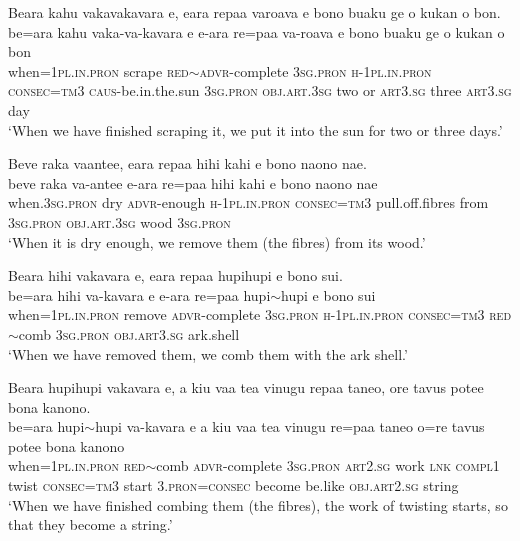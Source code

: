 \ea\label{ex:text20-6}
Beara kahu vakavakavara e, eara repaa varoava e bono buaku ge o kukan o bon.\\
\gll be=ara	kahu	vaka-va-kavara	e	e-ara	re=paa	va-roava	e	bono	buaku	ge	o	kukan	o	bon\\
     when=1\textsc{pl}.\textsc{in}.\textsc{pron}	scrape	\textsc{red}{$\sim$}\textsc{advr}-complete	3\textsc{sg}.\textsc{pron}	\textsc{h}-1\textsc{pl}.\textsc{in}.\textsc{pron}	\textsc{consec}=\textsc{tm}3	\textsc{caus}-be.in.the.sun	3\textsc{sg}.\textsc{pron}	\textsc{obj}.\textsc{art}.3\textsc{sg}	two	or	\textsc{art}3.\textsc{sg}	three	\textsc{art}3.\textsc{sg}	day\\
\glt `When we have finished scraping it, we put it into the sun for two or three days.'
\z

\ea\label{ex:text20-7}
Beve raka vaantee, eara repaa hihi kahi e bono naono nae.\\
\gll beve	raka	va-antee	e-ara	re=paa	hihi	kahi	e	bono	naono	nae\\
     when.3\textsc{sg}.\textsc{pron}	dry	\textsc{advr}-enough	\textsc{h}-1\textsc{pl}.\textsc{in}.\textsc{pron}	\textsc{consec}=\textsc{tm}3	pull.off.fibres	from	3\textsc{sg}.\textsc{pron}	\textsc{obj}.\textsc{art}.3\textsc{sg}	wood	3\textsc{sg}.\textsc{pron}\\
\glt `When it is dry enough, we remove them  (the fibres) from its wood.'
\z

\ea\label{ex:text20-8}
Beara hihi vakavara e, eara repaa hupihupi e bono sui.\\
\gll be=ara	hihi	va-kavara	e	e-ara	re=paa	hupi{$\sim$}hupi	e	bono	sui\\
     when=1\textsc{pl}.\textsc{in}.\textsc{pron}	remove	\textsc{advr}-complete	3\textsc{sg}.\textsc{pron}	\textsc{h}-1\textsc{pl}.\textsc{in}.\textsc{pron}	\textsc{consec}=\textsc{tm}3	\textsc{red}{$\sim$}comb	3\textsc{sg}.\textsc{pron}	\textsc{obj}.\textsc{art}3.\textsc{sg}	ark.shell\\
\glt `When we have removed them, we comb them with the ark shell.'
\z

\ea\label{ex:text20-9}
Beara hupihupi vakavara e, a kiu vaa tea vinugu repaa taneo, ore tavus potee bona kanono.\\
\gll be=ara	hupi{$\sim$}hupi	va-kavara	e	a	kiu	vaa	tea	vinugu	re=paa	taneo	o=re	tavus	potee	bona	kanono\\
     when=1\textsc{pl}.\textsc{in}.\textsc{pron}	\textsc{red}{$\sim$}comb	\textsc{advr}-complete	3\textsc{sg}.\textsc{pron}	\textsc{art}2.\textsc{sg}	work	\textsc{lnk}	\textsc{compl}1	twist	\textsc{consec}=\textsc{tm}3	start	3.\textsc{pron}=\textsc{consec}	become	be.like	\textsc{obj}.\textsc{art}2.\textsc{sg}	string\\
\glt `When we have finished combing them (the fibres), the work of twisting starts, so that they become a string.'
\z

